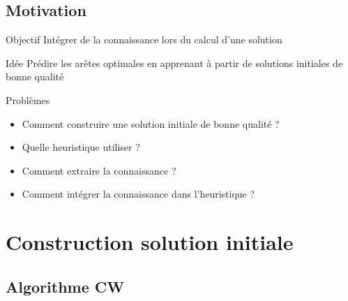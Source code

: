 \documentclass{beamer}
\begin{document}
\subsection{Motivation}

\begin{frame}
\begin{block}{Objectif}
Intégrer de la connaissance lors du calcul d'une solution
\end{block}

\begin{exampleblock}{Idée}
Prédire les arêtes optimales en apprenant à partir de solutions initiales de bonne qualité
\end{exampleblock}

\begin{alertblock}{Problèmes}
\begin{itemize}
\item Comment construire une solution initiale de bonne qualité ?
\item Quelle heuristique utiliser ?
\item Comment extraire la connaissance ?
\item Comment intégrer la connaissance dans l'heuristique ?
\end{itemize}
\end{alertblock}
\end{frame}

\section{Construction solution initiale}

\subsection{Algorithme CW}
\end{document}
